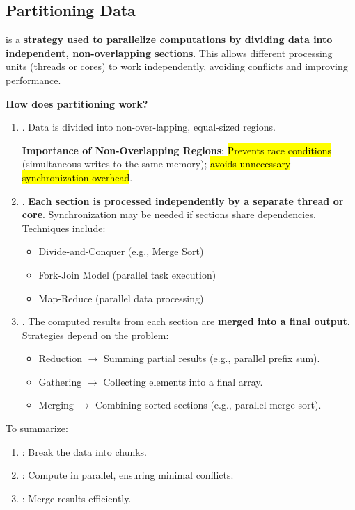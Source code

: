 \subsection{Partitioning Data}

 is a \textbf{strategy used to parallelize computations by dividing data into independent, non-overlapping sections}. This allows different processing units (threads or cores) to work independently, avoiding conflicts and improving performance.

\highspace
\begin{flushleft}
    \textcolor{Green3}{ \textbf{How does partitioning work?}}
\end{flushleft}
\begin{enumerate}
    \item {}. Data is divided into non-over-\break lapping, equal-sized regions.
    
    \textbf{Importance of Non-Overlapping Regions}: \hl{Prevents race conditions} (simultaneous writes to the same memory); \hl{avoids unnecessary synchronization overhead}.


    \item {}. \textbf{Each section is processed independently by a separate thread or core}. Synchronization may be needed if sections share dependencies. Techniques include:
    \begin{itemize}
        \item Divide-and-Conquer (e.g., Merge Sort)
        \item Fork-Join Model (parallel task execution)
        \item Map-Reduce (parallel data processing)
    \end{itemize}


    \item {}. The computed results from each section are \textbf{merged into a final output}. Strategies depend on the problem:
    \begin{itemize}
        \item Reduction $\rightarrow$ Summing partial results (e.g., parallel prefix sum).
        \item Gathering $\rightarrow$ Collecting elements into a final array.
        \item Merging $\rightarrow$ Combining sorted sections (e.g., parallel merge sort).
    \end{itemize}
\end{enumerate}
To summarize:
\begin{enumerate}
    \item {}: Break the data into chunks. 
    \item {}: Compute in parallel, ensuring minimal conflicts.
    \item {}: Merge results efficiently.
\end{enumerate}

